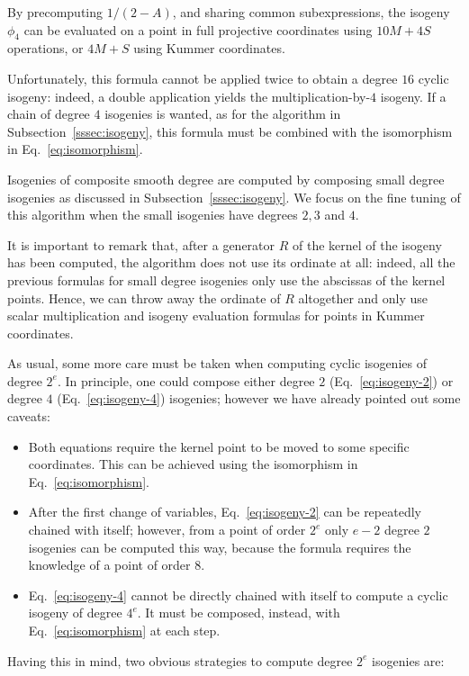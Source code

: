 By precomputing $1/(2-A)$, and sharing common subexpressions, the
isogeny $\phi_4$ can be evaluated on a point in full projective
coordinates using $10M+4S$ operations, or $4M+S$ using Kummer
coordinates.

Unfortunately, this formula cannot be applied twice to obtain a degree
$16$ cyclic isogeny: indeed, a double application yields the
multiplication-by-$4$ isogeny. If a chain of degree $4$ isogenies is
wanted, as for the algorithm in Subsection~\ref{sssec:isogeny}, this
formula must be combined with the isomorphism in
Eq.~\eqref{eq:isomorphism}.

Isogenies of composite smooth degree are computed by composing small
degree isogenies as discussed in Subsection~\ref{sssec:isogeny}. We
focus on the fine tuning of this algorithm when the small isogenies
have degrees $2,3$ and $4$.

It is important to remark that, after a generator $R$ of the kernel of
the isogeny has been computed, the algorithm does not use its ordinate
at all: indeed, all the previous formulas for small degree isogenies
only use the abscissas of the kernel points. Hence, we can throw away
the ordinate of $R$ altogether and only use scalar multiplication and
isogeny evaluation formulas for points in Kummer
coordinates.

As usual, some more care must be taken when computing cyclic isogenies
of degree $2^e$. In principle, one could compose either degree $2$
(Eq.~\ref{eq:isogeny-2}) or degree $4$ (Eq.~\ref{eq:isogeny-4})
isogenies; however we have already pointed out some caveats:

\begin{itemize}
\item Both equations require the kernel point to be moved to some
  specific coordinates. This can be achieved using the isomorphism in
  Eq.~\eqref{eq:isomorphism}.
\item After the first change of variables, Eq.~\eqref{eq:isogeny-2}
  can be repeatedly chained with itself; however, from a point of
  order $2^e$ only $e-2$ degree $2$ isogenies can be computed this
  way, because the formula requires the knowledge of a point of order $8$.
\item Eq.~\eqref{eq:isogeny-4} cannot be directly chained with itself
  to compute a cyclic isogeny of degree $4^e$. It must be composed,
  instead, with Eq.~\eqref{eq:isomorphism} at each step.
\end{itemize}

Having this in mind, two obvious strategies to compute degree $2^e$
isogenies are:

